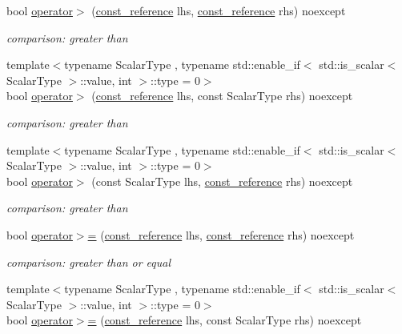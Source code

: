 \begin{DoxyCompactItemize}
bool \hyperlink{classnlohmann_1_1basic__json_a87db51b6b936fb2ea293cdbc8702dcb8}{operator$>$} (\hyperlink{classnlohmann_1_1basic__json_a4057c5425f4faacfe39a8046871786ca}{const\+\_\+reference} lhs, \hyperlink{classnlohmann_1_1basic__json_a4057c5425f4faacfe39a8046871786ca}{const\+\_\+reference} rhs) noexcept
\begin{DoxyCompactList}\small\item\em comparison\+: greater than \end{DoxyCompactList}\item 
{\footnotesize template$<$typename Scalar\+Type , typename std\+::enable\+\_\+if$<$ std\+::is\+\_\+scalar$<$ Scalar\+Type $>$\+::value, int $>$\+::type  = 0$>$ }\\bool \hyperlink{classnlohmann_1_1basic__json_a412895af9a582869a4d369a64fb1b6d6}{operator$>$} (\hyperlink{classnlohmann_1_1basic__json_a4057c5425f4faacfe39a8046871786ca}{const\+\_\+reference} lhs, const Scalar\+Type rhs) noexcept
\begin{DoxyCompactList}\small\item\em comparison\+: greater than \end{DoxyCompactList}\item 
{\footnotesize template$<$typename Scalar\+Type , typename std\+::enable\+\_\+if$<$ std\+::is\+\_\+scalar$<$ Scalar\+Type $>$\+::value, int $>$\+::type  = 0$>$ }\\bool \hyperlink{classnlohmann_1_1basic__json_a124c319566198d9f092c5bebea46ce77}{operator$>$} (const Scalar\+Type lhs, \hyperlink{classnlohmann_1_1basic__json_a4057c5425f4faacfe39a8046871786ca}{const\+\_\+reference} rhs) noexcept
\begin{DoxyCompactList}\small\item\em comparison\+: greater than \end{DoxyCompactList}\item 
bool \hyperlink{classnlohmann_1_1basic__json_a74a943800c7f103d0990d7eef82c6453}{operator$>$=} (\hyperlink{classnlohmann_1_1basic__json_a4057c5425f4faacfe39a8046871786ca}{const\+\_\+reference} lhs, \hyperlink{classnlohmann_1_1basic__json_a4057c5425f4faacfe39a8046871786ca}{const\+\_\+reference} rhs) noexcept
\begin{DoxyCompactList}\small\item\em comparison\+: greater than or equal \end{DoxyCompactList}\item 
{\footnotesize template$<$typename Scalar\+Type , typename std\+::enable\+\_\+if$<$ std\+::is\+\_\+scalar$<$ Scalar\+Type $>$\+::value, int $>$\+::type  = 0$>$ }\\bool \hyperlink{classnlohmann_1_1basic__json_a68e3a92b3d9be1faa05c92d096299189}{operator$>$=} (\hyperlink{classnlohmann_1_1basic__json_a4057c5425f4faacfe39a8046871786ca}{const\+\_\+reference} lhs, const Scalar\+Type rhs) noexcept

\end{DoxyCompactItemize}
